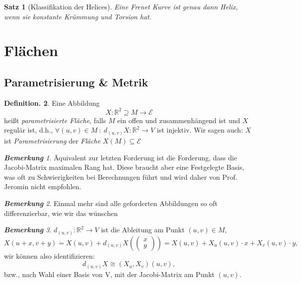 \documentclass[a4paper,oneside,11pt,DIV=12,parskip=half]{scrartcl}
\newcommand{\R}{\mathbb R}
\newcommand{\E}{\mathcal E}
\theoremstyle{plain}
\newtheorem{theorem}{Satz}[section]
\theoremstyle{definition}
\newtheorem{definition}[theorem]{Definition.}
\newtheorem{remark, definition}[theorem]{Bemerkung und Definition.}
\newtheorem{lemma, definition}[theorem]{Lemma und Definition.}
\theoremstyle{remark}
\newtheorem*{remark}{\textbf{Bemerkung}}
\newtheorem*{remark, example}{\textbf{Bemerkung und Beispiel}}
\begin{document}
\begin{theorem}[Klassifikation der Helices]
	Eine Frenet Kurve ist genau dann Helix, wenn sie konstante Krümmung und Torsion hat.
\end{theorem}


\pagebreak
\section{Flächen}

\subsection{Parametrisierung \& Metrik}
\begin{definition}
	

Eine Abbildung \[ X:\R^2 \supseteq M \rightarrow \E \] heißt \emph{parametrisierte Fläche}, falls $M$ ein offen und zusammenhängend ist und $X$ regulär ist, d.h., $  \forall(u,v) \in M~:~d_{(u,v)}X: \R^2 \rightarrow V $ ist injektiv.
Wir sagen auch: $  X  $ ist \emph{Parametrisierung} der \emph{Fläche} $ X(M) \subseteq \E $

\end{definition}

\begin{remark}
	
 Äquivalent zur letzten Forderung ist die Forderung, dass die Jacobi-Matrix maximalen Rang hat. Diese braucht aber eine Festgelegte Basis, was oft zu Schwierigkeiten bei Berechnungen führt und wird daher von Prof. Jeromin nicht empfohlen.

\end{remark}

\begin{remark}
	Einmal mehr sind alle geforderten Abbildungen so oft differenzierbar, wie wir das wünschen
\end{remark}

\begin{remark}
	
	$ d_{(u,v)} : \R^2 \rightarrow V$ ist die Ableitung am Punkt $ (u,v) \in M $, \[X(u+x,v+y) \dot{=} X(u,v) + d_{(u,v)}  X(\begin{pmatrix}
	x\\
	y
	\end{pmatrix}) = X(u,v) + X_u(u,v)\cdot x + X_v(u,v)\cdot y,  \]
	wir können also identifizieren: \[ d_{(u,v)}X \cong (X_u,X_v)(u,v), \]
	bzw., nach Wahl einer Basis von V, mit der Jacobi-Matrix am Punkt $ (u,v) $.
	
\end{remark}
\end{document}
